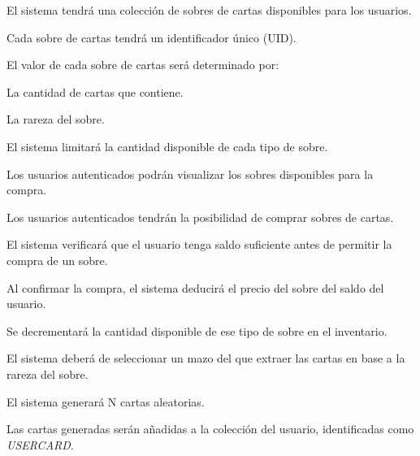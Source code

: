 

\hypertarget{req_sobres}{}

\begin{RFSobres}
	\item El sistema tendrá una colección de sobres de cartas disponibles para los usuarios.
	\begin{RFSobres}
		\item Cada sobre de cartas tendrá un identificador único (UID).
		\item El valor de cada sobre de cartas será determinado por:
		\begin{RFSobres}
			\item La cantidad de cartas que contiene.
			\item La rareza del sobre.
		\end{RFSobres}
		\item El sistema limitará la cantidad disponible de cada tipo de sobre.
	\end{RFSobres}
	\item Los usuarios autenticados podrán visualizar los sobres disponibles para la compra.
	\item Los usuarios autenticados tendrán la posibilidad de comprar sobres de cartas.\label{req_compra_sobres}
	\begin{RFSobres}
		\item El sistema verificará que el usuario tenga saldo suficiente antes de permitir la compra de un sobre.
		\item Al confirmar la compra, el sistema deducirá el precio del sobre del saldo del usuario.
		\item Se decrementará la cantidad disponible de ese tipo de sobre en el inventario.
		\item El sistema deberá de seleccionar un mazo del que extraer las cartas en base a la rareza del sobre.
		\item El sistema generará N cartas aleatorias.
		\item Las cartas generadas serán añadidas a la colección del usuario, identificadas como \textit{USERCARD}.

\end{RFSobres}
\end{RFSobres}
